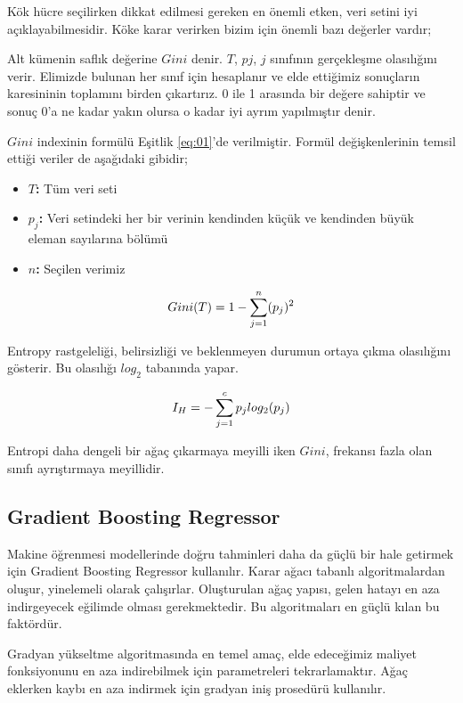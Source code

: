 \documentclass[conference]{IEEEtran}
\begin{document}
\quad Kök hücre seçilirken dikkat edilmesi gereken en önemli etken, veri setini iyi açıklayabilmesidir. Köke karar verirken bizim için önemli bazı değerler vardır\cite{4};

\quad Alt kümenin saflık değerine $Gini$ denir. $T$, $pj$, $j$ sınıfının gerçekleşme olasılığını verir. Elimizde bulunan her sınıf için hesaplanır ve elde ettiğimiz sonuçların karesininin toplamını birden çıkartırız. 0 ile 1 arasında bir değere sahiptir ve sonuç 0'a ne kadar yakın olursa o kadar iyi ayrım yapılmıştır denir\cite{4}. 

\quad $Gini$ indexinin formülü Eşitlik \ref{eq:01}'de verilmiştir\cite{15}. Formül değişkenlerinin temsil ettiği veriler de aşağıdaki gibidir;
\begin{itemize}
\item \textbf{$T$:} Tüm veri seti
\item \textbf{$p_{j}$:} Veri setindeki her bir verinin kendinden küçük ve kendinden büyük eleman sayılarına bölümü
\item \textbf{$n$:}  Seçilen verimiz
\end{itemize}

\begin{equation}
\label{eq:01}
\Large Gini(T)=1-\sum_{j=1}^{n}(p_{j})^2
\end{equation}

\pagebreak
\quad Entropy rastgeleliği, belirsizliği ve beklenmeyen durumun ortaya çıkma olasılığını gösterir\cite{5}.  Bu olasılığı $log_{2}$ tabanında yapar\cite{4}.

\begin{equation}
\label{eq:02}
\Large I_{H}=-\sum_{j=1}^{c}p_{j}log_{2}(p_{j})
\end{equation}

\quad Entropi daha dengeli bir ağaç çıkarmaya meyilli iken $Gini$, frekansı fazla olan sınıfı ayrıştırmaya meyillidir.

\subsection{\textbf{Gradient Boosting Regressor}}
\quad Makine öğrenmesi modellerinde doğru tahminleri daha da güçlü bir hale getirmek için Gradient Boosting Regressor kullanılır. Karar ağacı tabanlı algoritmalardan oluşur, yinelemeli olarak çalışırlar. Oluşturulan ağaç yapısı, gelen hatayı en aza indirgeyecek eğilimde olması gerekmektedir. Bu algoritmaları en güçlü kılan bu faktördür\cite{6}.

\quad Gradyan yükseltme algoritmasında en temel amaç, elde edeceğimiz maliyet fonksiyonunu en aza indirebilmek için parametreleri tekrarlamaktır. Ağaç eklerken kaybı en aza indirmek için gradyan iniş prosedürü kullanılır\cite{6}.
\end{document}
